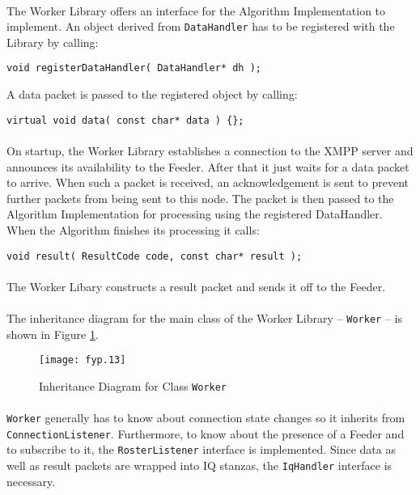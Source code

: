 \paragraph{}
The Worker Library offers an interface for the Algorithm Implementation to implement. An object derived from \texttt{DataHandler} has to be registered with the Library by calling:
\begin{flushleft}
\texttt{void registerDataHandler( DataHandler* dh );}
\end{flushleft}
A data packet is passed to the registered object by calling:
\begin{flushleft}
\texttt{virtual void data( const char* data ) \{\};}
\end{flushleft}

\paragraph{}
On startup, the Worker Library establishes a connection to the XMPP server and announces its availability to the Feeder. After that it just waits for a data packet to arrive. When such a packet is received, an acknowledgement is sent to prevent further packets from being sent to this node. The packet is then passed to the Algorithm Implementation for processing using the registered DataHandler. When the Algorithm finishes its processing it calls:
\begin{flushleft}
\texttt{void result( ResultCode code, const char* result );}
\end{flushleft}
\paragraph{}
The Worker Libary constructs a result packet and sends it off to the Feeder.

\paragraph{}
The inheritance diagram for the main class of the Worker Library -- \texttt{Worker} -- is shown in Figure \ref{fig:inhworker}.

\begin{figure}[H]
\begin{center}
\texttt{[image: fyp.13]}
\end{center}
\caption{Inheritance Diagram for Class \texttt{Worker}}
\label{fig:inhworker}
\end{figure}

\paragraph{}
\texttt{Worker} generally has to know about connection state changes so it inherits from \texttt{ConnectionListener}. Furthermore, to know about the presence of a Feeder and to subscribe to it, the \texttt{RosterListener} interface is implemented. Since data as well as result packets are wrapped into IQ stanzas, the \texttt{IqHandler} interface is necessary.


